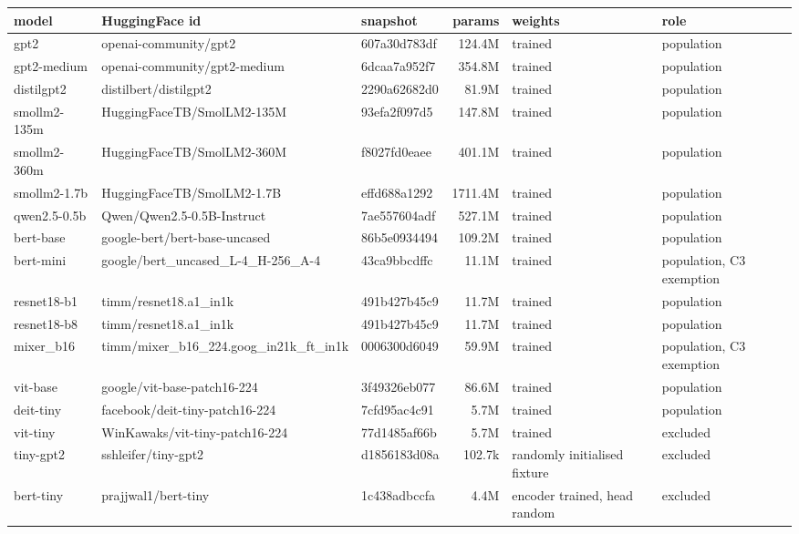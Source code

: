 \begin{tabular}{lllrll}
\toprule
model & HuggingFace id & snapshot & params & weights & role \\
\midrule
gpt2 & openai-community/gpt2 & 607a30d783df & 124.4M & trained & population \\
gpt2-medium & openai-community/gpt2-medium & 6dcaa7a952f7 & 354.8M & trained & population \\
distilgpt2 & distilbert/distilgpt2 & 2290a62682d0 & 81.9M & trained & population \\
smollm2-135m & HuggingFaceTB/SmolLM2-135M & 93efa2f097d5 & 147.8M & trained & population \\
smollm2-360m & HuggingFaceTB/SmolLM2-360M & f8027fd0eaee & 401.1M & trained & population \\
smollm2-1.7b & HuggingFaceTB/SmolLM2-1.7B & effd688a1292 & 1711.4M & trained & population \\
qwen2.5-0.5b & Qwen/Qwen2.5-0.5B-Instruct & 7ae557604adf & 527.1M & trained & population \\
bert-base & google-bert/bert-base-uncased & 86b5e0934494 & 109.2M & trained & population \\
bert-mini & google/bert\_uncased\_L-4\_H-256\_A-4 & 43ca9bbcdffc & 11.1M & trained & population, C3 exemption \\
resnet18-b1 & timm/resnet18.a1\_in1k & 491b427b45c9 & 11.7M & trained & population \\
resnet18-b8 & timm/resnet18.a1\_in1k & 491b427b45c9 & 11.7M & trained & population \\
mixer\_b16 & timm/mixer\_b16\_224.goog\_in21k\_ft\_in1k & 0006300d6049 & 59.9M & trained & population, C3 exemption \\
vit-base & google/vit-base-patch16-224 & 3f49326eb077 & 86.6M & trained & population \\
deit-tiny & facebook/deit-tiny-patch16-224 & 7cfd95ac4c91 & 5.7M & trained & population \\
vit-tiny & WinKawaks/vit-tiny-patch16-224 & 77d1485af66b & 5.7M & trained & excluded \\
tiny-gpt2 & sshleifer/tiny-gpt2 & d1856183d08a & 102.7k & randomly initialised fixture & excluded \\
bert-tiny & prajjwal1/bert-tiny & 1c438adbccfa & 4.4M & encoder trained, head random & excluded \\
\bottomrule
\end{tabular}
